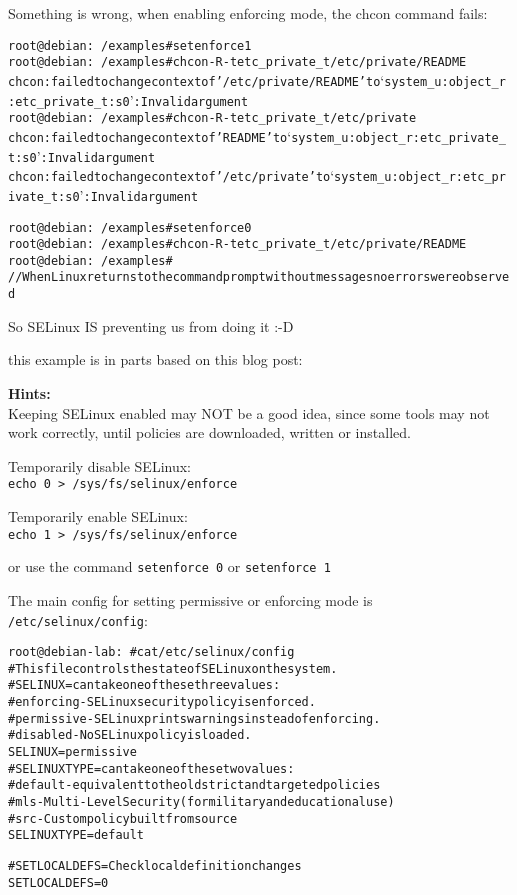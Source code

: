 \documentclass[a4paper,11pt,notitlepage]{report}
\begin{document}
Something is wrong, when enabling enforcing mode, the chcon command fails:
\begin{alltt}
root@debian:~/examples# setenforce 1
root@debian:~/examples# chcon -R -t etc_private_t /etc/private/README
chcon: failed to change context of '/etc/private/README' to ‘system_u:object_r:etc_private_t:s0’: Invalid argument
root@debian:~/examples# chcon -R -t etc_private_t /etc/private
chcon: failed to change context of 'README' to ‘system_u:object_r:etc_private_t:s0’: Invalid argument
chcon: failed to change context of '/etc/private' to ‘system_u:object_r:etc_private_t:s0’: Invalid argument

root@debian:~/examples# setenforce 0
root@debian:~/examples# chcon -R -t etc_private_t /etc/private/README
root@debian:~/examples#
// When Linux returns to the command prompt without messages no errors were observed
\end{alltt}

So SELinux IS preventing us from doing it :-D

this example is in parts based on this blog post:\\


{\bf Hints:}\\
Keeping SELinux enabled may NOT be a good idea, since some tools may not work correctly, until policies are downloaded, written or installed.

Temporarily disable SELinux:\\
\verb+echo 0 > /sys/fs/selinux/enforce+

Temporarily enable SELinux:\\
\verb+echo 1 > /sys/fs/selinux/enforce+

or use the command \verb+setenforce 0+ or
\verb+setenforce 1+

The main config for setting permissive or enforcing mode is
\verb+/etc/selinux/config+:
\begin{alltt}
root@debian-lab:~# cat /etc/selinux/config
# This file controls the state of SELinux on the system.
# SELINUX= can take one of these three values:
# enforcing - SELinux security policy is enforced.
# permissive - SELinux prints warnings instead of enforcing.
# disabled - No SELinux policy is loaded.
SELINUX=permissive
# SELINUXTYPE= can take one of these two values:
# default - equivalent to the old strict and targeted policies
# mls     - Multi-Level Security (for military and educational use)
# src     - Custom policy built from source
SELINUXTYPE=default

# SETLOCALDEFS= Check local definition changes
SETLOCALDEFS=0
\end{alltt}
\end{document}
